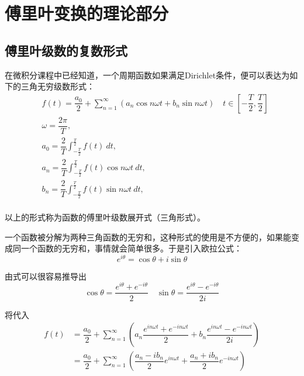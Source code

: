 \chapter{傅里叶变换的理论部分}
    \section{傅里叶级数的复数形式}
        在微积分课程中已经知道，一个周期函数如果满足Dirichlet条件，便可以表达为如下的三角无穷级数形式：
        \begin{equation}
            \begin{split}
                &f(t)=\dfrac{a_0}{2}+\sum_{n = 1}^\infty(a_n\cos n\omega t+b_n\sin n\omega t)\quad t\in [-\dfrac{T}{2}, \dfrac{T}{2}]\\
                &\omega= \dfrac{2\pi}{T},\\
                &a_0=\dfrac{2}{T}\int_{-\frac{T}{2}}^{\frac{T}{2}}f(t)\ dt,\\
                &a_n=\dfrac{2}{T}\int_{-\frac{T}{2}}^{\frac{T}{2}}f(t)\cos n\omega t\ dt,\\
                &b_n=\dfrac{2}{T}\int_{-\frac{T}{2}}^{\frac{T}{2}}f(t)\sin n\omega t\ dt,\\
            \end{split}
            \label{eq: 1.1}
        \end{equation}

        以上的形式称为函数的傅里叶级数展开式（三角形式）。

        一个函数被分解为两种三角函数的无穷和，这种形式的使用是不方便的，如果能变成同一个函数的无穷和，事情就会简单很多。于是引入欧拉公式：
        \begin{equation}
            e^{i\theta}=\cos \theta +i \sin\theta
            \label{eq: 1.2}
        \end{equation}

        由式可以很容易推导出
        \begin{equation}
            \cos\theta =\dfrac{e^{i\theta}+e^{-i\theta}}{2}\quad \sin\theta = \dfrac{e^{i\theta}-e^{-i\theta}}{2i}
            \label{eq: 1.3}
        \end{equation}

        将代入
        \begin{equation}
            \begin{split}
                f(t)&=\dfrac{a_0}{2}+\sum\limits_{n = 1}^\infty(a_n\dfrac{e^{in\omega t}+e^{-in\omega t}}{2}+b_n\dfrac{e^{in\omega t}-e^{-in\omega t}}{2i})\\
                &= \dfrac{a_0}{2}+\sum\limits_{n = 1}^\infty(\dfrac{a_n-i b_n}{2}e^{in\omega t}+\dfrac{a_n+i b_n}{2}e^{-in\omega t})
            \end{split}
            \label{eq: 1.4}
        \end{equation}
        
